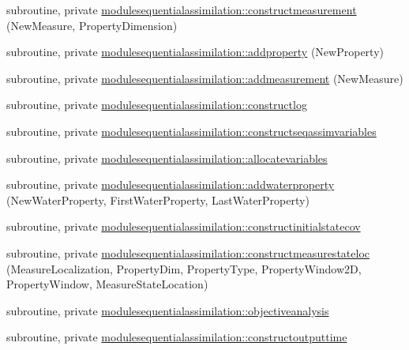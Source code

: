 \begin{DoxyCompactItemize}
\item 
subroutine, private \mbox{\hyperlink{namespacemodulesequentialassimilation_af3fc907b2e8cf5fb7cad188eb652528d}{modulesequentialassimilation\+::constructmeasurement}} (New\+Measure, Property\+Dimension)
\item 
subroutine, private \mbox{\hyperlink{namespacemodulesequentialassimilation_a47355d6dd2eb8e4c089b3f5c5170d3d7}{modulesequentialassimilation\+::addproperty}} (New\+Property)
\item 
subroutine, private \mbox{\hyperlink{namespacemodulesequentialassimilation_a4263d5378b1943e8de2e1465b38720e8}{modulesequentialassimilation\+::addmeasurement}} (New\+Measure)
\item 
subroutine, private \mbox{\hyperlink{namespacemodulesequentialassimilation_a199d6fc518c2a4bb9604a7fdbf0ca4e6}{modulesequentialassimilation\+::constructlog}}
\item 
subroutine, private \mbox{\hyperlink{namespacemodulesequentialassimilation_adb290ebd31525621b87da4ea0f2c443c}{modulesequentialassimilation\+::constructseqassimvariables}}
\item 
subroutine, private \mbox{\hyperlink{namespacemodulesequentialassimilation_af08be0960351f7f29fe3b0b796b72da3}{modulesequentialassimilation\+::allocatevariables}}
\item 
subroutine, private \mbox{\hyperlink{namespacemodulesequentialassimilation_a891242d04c33e25fc2d6c1b0bbbcdb59}{modulesequentialassimilation\+::addwaterproperty}} (New\+Water\+Property, First\+Water\+Property, Last\+Water\+Property)
\item 
subroutine, private \mbox{\hyperlink{namespacemodulesequentialassimilation_ab636e048b1738282bf697c69d3e4fd10}{modulesequentialassimilation\+::constructinitialstatecov}}
\item 
subroutine, private \mbox{\hyperlink{namespacemodulesequentialassimilation_aa4ca5ec886a894c6fe06ffd71d5fcb55}{modulesequentialassimilation\+::constructmeasurestateloc}} (Measure\+Localization, Property\+Dim, Property\+Type, Property\+Window2D, Property\+Window, Measure\+State\+Location)
\item 
subroutine, private \mbox{\hyperlink{namespacemodulesequentialassimilation_a09e6002fa92db2aafb977540ff4479fb}{modulesequentialassimilation\+::objectiveanalysis}}
\item 
subroutine, private \mbox{\hyperlink{namespacemodulesequentialassimilation_a4636d1cd0c10613f19a1ca651b6b482f}{modulesequentialassimilation\+::constructoutputtime}}
\item 

\end{DoxyCompactItemize}
